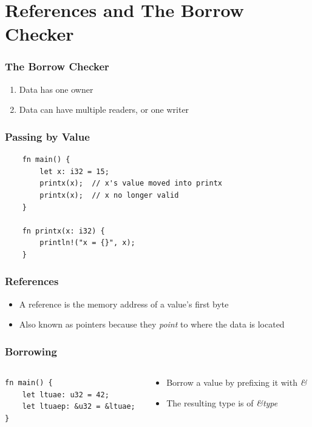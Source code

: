 \documentclass{beamer}
\begin{document}
\section{References and The Borrow Checker}
\begin{frame}
    \frametitle{The Borrow Checker}
    \begin{enumerate}
        \item Data has one owner
        \item Data can have multiple readers, or one writer
    \end{enumerate}
\end{frame}
\begin{frame}[fragile]
    \frametitle{Passing by Value}
    \begin{verbatim}
    fn main() {
        let x: i32 = 15;
        printx(x);  // x's value moved into printx
        printx(x);  // x no longer valid
    }

    fn printx(x: i32) {
        println!("x = {}", x);
    }
    \end{verbatim}
\end{frame}
\begin{frame}[fragile]
    \frametitle{References}
    \begin{itemize}
        \item A reference is the memory address of a value's first byte
        \item Also known as pointers because they \textit{point} to where the data is located
    \end{itemize}
\end{frame}
\begin{frame}[fragile]
    \frametitle{Borrowing}
    \begin{columns}
        \begin{column}{0.5\textwidth}
            \begin{verbatim}
fn main() {
    let ltuae: u32 = 42;
    let ltuaep: &u32 = &ltuae;
}
            \end{verbatim}
        \end{column}
        \begin{column}{0.5\textwidth}
            \begin{itemize}
                \item Borrow a value by prefixing it with \textit{\&}
                \item The resulting type is of \textit{\&type}
            \end{itemize}
        \end{column}
    \end{columns}
\end{frame}
\end{document}
